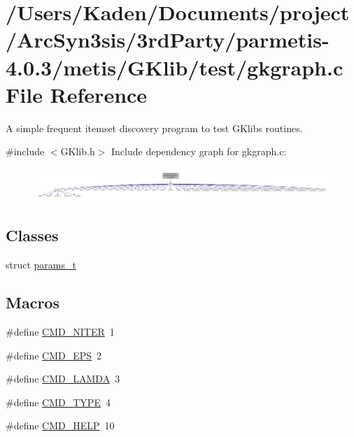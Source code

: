 \hypertarget{a00149}{}\section{/\+Users/\+Kaden/\+Documents/project/\+Arc\+Syn3sis/3rd\+Party/parmetis-\/4.0.3/metis/\+G\+Klib/test/gkgraph.c File Reference}
\label{a00149}


A simple frequent itemset discovery program to test G\+Klib\textquotesingle{}s routines.  


{\ttfamily \#include $<$G\+Klib.\+h$>$}\newline
Include dependency graph for gkgraph.\+c\+:\nopagebreak
\begin{figure}[H]
\begin{center}
\leavevmode
\includegraphics[width=350pt]{a00150}
\end{center}
\end{figure}
\subsection*{Classes}
\begin{DoxyCompactItemize}
\item 
struct \hyperlink{a00706}{params\+\_\+t}
\end{DoxyCompactItemize}
\subsection*{Macros}
\begin{DoxyCompactItemize}
\item 
\#define \hyperlink{a00149_a26e9eb9179a727d896d5524a20dd80fd}{C\+M\+D\+\_\+\+N\+I\+T\+ER}~1
\item 
\#define \hyperlink{a00149_aebb6662065473a711abeccb460b3979c}{C\+M\+D\+\_\+\+E\+PS}~2
\item 
\#define \hyperlink{a00149_a40a2b39955e074d183af22cf8f2655e3}{C\+M\+D\+\_\+\+L\+A\+M\+DA}~3
\item 
\#define \hyperlink{a00149_a191373ee6717f2d688081e5f814778dd}{C\+M\+D\+\_\+\+T\+Y\+PE}~4
\item 
\#define \hyperlink{a00149_a42553adbbb23a03ca876697c00ea44b1}{C\+M\+D\+\_\+\+H\+E\+LP}~10
\end{DoxyCompactItemize}
